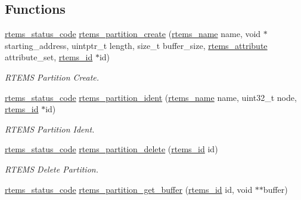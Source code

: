 \subsection*{Functions}
\begin{DoxyCompactItemize}
\item 
\mbox{\hyperlink{group__ClassicStatus_ga545d41846817eaba6143d52ee4d9e9fe}{rtems\+\_\+status\+\_\+code}} \mbox{\hyperlink{group__ClassicPart_gaae1e45358170b1de610acdae7f4a8148}{rtems\+\_\+partition\+\_\+create}} (\mbox{\hyperlink{group__ClassicTasks_ga55fb63c49f68c0cbd9bee004da15b1fd}{rtems\+\_\+name}} name, void $\ast$starting\+\_\+address, uintptr\+\_\+t length, size\+\_\+t buffer\+\_\+size, \mbox{\hyperlink{group__ClassicAttributes_gaea40313cf78ed843e09c4315d0a10f79}{rtems\+\_\+attribute}} attribute\+\_\+set, \mbox{\hyperlink{group__ClassicTasks_gab20892b814dced7dd4e5b9bf42becd57}{rtems\+\_\+id}} $\ast$id)
\begin{DoxyCompactList}\small\item\em R\+T\+E\+MS Partition Create. \end{DoxyCompactList}\item 
\mbox{\hyperlink{group__ClassicStatus_ga545d41846817eaba6143d52ee4d9e9fe}{rtems\+\_\+status\+\_\+code}} \mbox{\hyperlink{group__ClassicPart_gaffd4b6ba83ea979c77996bee624a7dc2}{rtems\+\_\+partition\+\_\+ident}} (\mbox{\hyperlink{group__ClassicTasks_ga55fb63c49f68c0cbd9bee004da15b1fd}{rtems\+\_\+name}} name, uint32\+\_\+t node, \mbox{\hyperlink{group__ClassicTasks_gab20892b814dced7dd4e5b9bf42becd57}{rtems\+\_\+id}} $\ast$id)
\begin{DoxyCompactList}\small\item\em R\+T\+E\+MS Partition Ident. \end{DoxyCompactList}\item 
\mbox{\hyperlink{group__ClassicStatus_ga545d41846817eaba6143d52ee4d9e9fe}{rtems\+\_\+status\+\_\+code}} \mbox{\hyperlink{group__ClassicPart_ga9cb3af79cb02585887caa1f4a2a62deb}{rtems\+\_\+partition\+\_\+delete}} (\mbox{\hyperlink{group__ClassicTasks_gab20892b814dced7dd4e5b9bf42becd57}{rtems\+\_\+id}} id)
\begin{DoxyCompactList}\small\item\em R\+T\+E\+MS Delete Partition. \end{DoxyCompactList}\item 
\mbox{\hyperlink{group__ClassicStatus_ga545d41846817eaba6143d52ee4d9e9fe}{rtems\+\_\+status\+\_\+code}} \mbox{\hyperlink{group__ClassicPart_gaf0a90e627ac77b6bf0b1832d52ad0d59}{rtems\+\_\+partition\+\_\+get\+\_\+buffer}} (\mbox{\hyperlink{group__ClassicTasks_gab20892b814dced7dd4e5b9bf42becd57}{rtems\+\_\+id}} id, void $\ast$$\ast$buffer)
$$
\end{DoxyCompactItemize}
